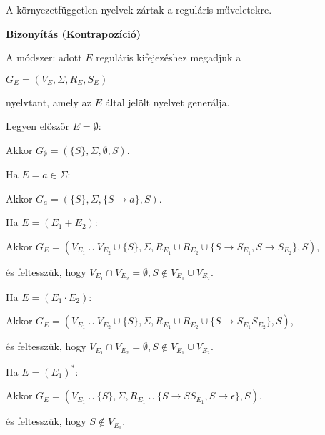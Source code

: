 \documentclass[10pt]{article}
\renewcommand{\\}{\par\noindent}
\begin{document}
\begin{frame}
\begin{tcolorbox}[squeezed title={Tétel: Környezetfüggetlen nyelvek műveleti zártsága}]
A környezetfüggetlen nyelvek zártak a reguláris műveletekre.\\
\tcblower
\smallskip
\underline{\textbf{Bizonyítás (Kontrapozíció)}}\\
\medskip
A módszer: adott $E$ reguláris kifejezéshez megadjuk a\\
$G_E = (V_E, {\Sigma}, R_E, S_E)$\\
nyelvtant, amely az $E$ által jelölt nyelvet generálja.\\
\bigskip
Legyen először $E = \emptyset$:\\
Akkor $G_{\emptyset} = (\{S\}, {\Sigma}, \emptyset, S)$.\\
\bigskip
Ha $E = a \in {\Sigma}$:\\
Akkor $G_a = (\{S\}, {\Sigma}, \{S \rightarrow a\}, S)$.\\
\bigskip
Ha $E = (E_1 + E_2)$:\\
Akkor $G_E = (V_{E_1} \cup V_{E_2} \cup \{S\}, \Sigma, R_{E_1} \cup R_{E_2} \cup \{S \rightarrow S_{E_1}, S \rightarrow S_{E_2}\}, S)$,\\
és feltesszük, hogy $V_{E_1} \cap V_{E_2} = {\emptyset}, S \notin V_{E_1} \cup V_{E_2}$.\\
\bigskip
Ha $E = (E_1 \cdot E_2)$:\\
Akkor $G_E = (V_{E_1} \cup V_{E_2} \cup \{S\}, \Sigma, R_{E_1} \cup R_{E_2} \cup \{S \rightarrow S_{E_1}S_{E_2}\}, S)$,\\
és feltesszük, hogy $V_{E_1} \cap V_{E_2} = {\emptyset}, S \notin V_{E_1} \cup V_{E_2}$.\\
\bigskip
Ha $E = (E_1)^*$:\\
Akkor $G_E = (V_{E_1} \cup \{S\}, \Sigma, R_{E_1} \cup \{S \rightarrow SS_{E_1}, S \rightarrow \epsilon \}, S)$,\\
és feltesszük, hogy $S \notin V_{E_1}$.\\

\end{tcolorbox}
\end{frame}
\end{document}
